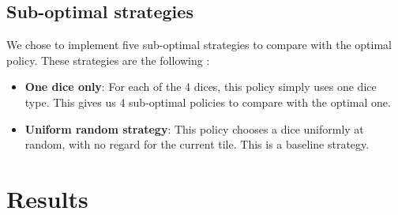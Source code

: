 \documentclass[12pt, twocolumn]{article}
\begin{document}
\subsection*{Sub-optimal strategies}
\noindent We chose to implement five sub-optimal strategies to compare with the optimal policy. These strategies are the following :
\begin{itemize}

    \item \textbf{One dice only}: For each of the 4 dices, this policy simply uses one dice type. This gives us 4 sub-optimal policies to compare with the optimal one.
    \item \textbf{Uniform random strategy}: This policy chooses a dice uniformly at random, with no regard for the current tile. This is a baseline strategy.

\end{itemize}


\section*{Results}

\end{document}
